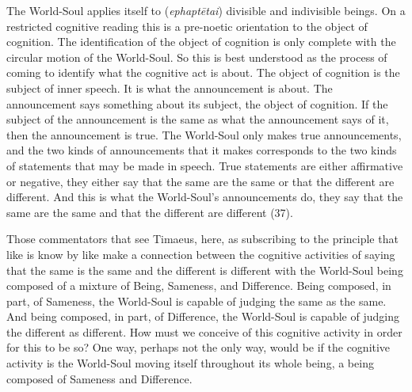 The World-Soul applies itself to (\emph{ephaptētai}) divisible and indivisible beings. On a restricted cognitive reading this is a pre-noetic orientation to the object of cognition. The identification of the object of cognition is only complete with the circular motion of the World-Soul. So this is best understood as the process of coming to identify what the cognitive act is about. The object of cognition is the subject of inner speech. It is what the announcement is about. The announcement says something about its subject, the object of cognition. If the subject of the announcement is the same as what the announcement says of it, then the announcement is true. The World-Soul only makes true announcements, and the two kinds of announcements that it makes corresponds to the two kinds of statements that may be made in speech. True statements are either affirmative or negative, they either say that the same are the same or that the different are different. And this is what the World-Soul's announcements do, they say that the same are the same and that the different are different (37).

Those commentators that see Timaeus, here, as subscribing to the principle that like is know by like make a connection between the cognitive activities of saying that the same is the same and the different is different with the World-Soul being composed of a mixture of Being, Sameness, and Difference. Being composed, in part, of Sameness, the World-Soul is capable of judging the same as the same. And being composed, in part, of Difference, the World-Soul is capable of judging the different as different. How must we conceive of this cognitive activity in order for this to be so? One way, perhaps not the only way, would be if the cognitive activity is the World-Soul moving itself throughout its whole being, a being composed of Sameness and Difference.

